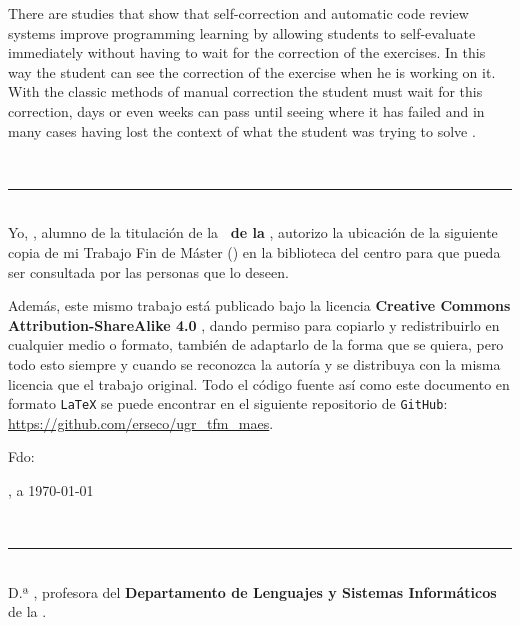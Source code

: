 {{\bigskip
There are studies that show that self-correction and automatic code review systems improve programming learning by allowing students to self-evaluate immediately without having to wait for the correction of the exercises. In this way the student can see the correction of the exercise when he is working on it. With the classic methods of manual correction the student must wait for this correction, days or even weeks can pass until seeing where it has failed and in many cases having lost the context of what the student was trying to solve \cite{benotti_effect_2018} \cite{noauthor_how_2019} \cite{rubio_uso_2018}.


\newpage
\thispagestyle{empty}
\
\vspace{3cm}

\noindent\rule[-1ex]{\textwidth}{2pt}\\[4.5ex]

Yo, \textbf{\autor}, alumno de la titulación \textbf{\master} de la \textbf{\escuela\ de la \universidad}, autorizo la ubicación de la siguiente copia de mi Trabajo Fin de Máster (\textit{\titulo}) en la biblioteca del centro para que pueda ser consultada por las personas que lo deseen.

\bigskip
Además, este mismo trabajo está publicado bajo la licencia \textbf{Creative Commons Attribution-ShareAlike 4.0} \cite{CC}, dando permiso para copiarlo y redistribuirlo en cualquier medio o formato, también de adaptarlo de la forma que se quiera, pero todo esto siempre y cuando se reconozca la autoría y se distribuya con la misma licencia que el trabajo original. Todo el código fuente así como este documento en formato {\tt LaTeX} se puede encontrar en el siguiente repositorio de {\tt GitHub}: \url{https://github.com/erseco/ugr_tfm_maes}.

\vspace{4cm}

\noindent Fdo: \autor

\vspace{2cm}

\begin{flushright}
\ciudad, a \today
\end{flushright}

\newpage
\thispagestyle{empty}
\
\vspace{3cm}

\noindent\rule[-1ex]{\textwidth}{2pt}\\[4.5ex]

D.ª \textbf{\tutor}, profesora del \textbf{Departamento de Lenguajes y Sistemas Informáticos} de la \textbf{\universidad}.

}}
